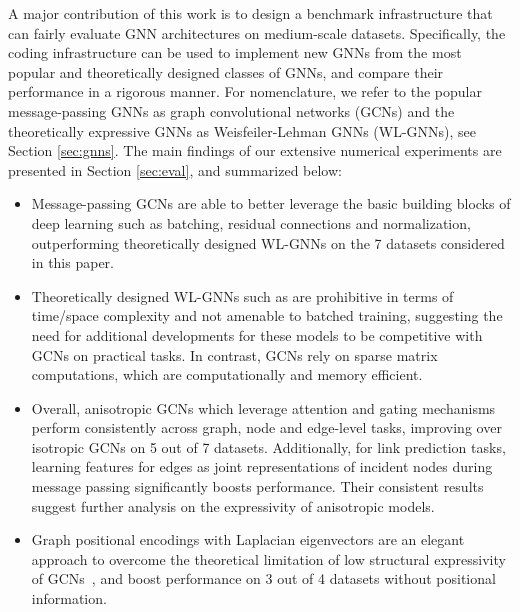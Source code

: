 \documentclass{article}
\begin{document}
A major contribution of this work is to design a benchmark infrastructure that can fairly evaluate GNN architectures on medium-scale datasets. Specifically, the coding infrastructure can be used to implement new GNNs from the most popular and theoretically designed classes of GNNs, and compare their performance in a rigorous manner. 
For nomenclature, we refer to the popular message-passing GNNs as graph convolutional networks (GCNs) and the theoretically expressive GNNs as Weisfeiler-Lehman GNNs (WL-GNNs), see Section \ref{sec:gnns}.
The main findings of our extensive numerical experiments are presented in Section \ref{sec:eval}, and summarized below:\vspace{-0.2cm}
\begin{itemize}[leftmargin=*]
    \item Message-passing GCNs \cite{kipf2017semi,hamilton2017inductive,Monti_2017,velickovic2018graph,bresson2017residual} are able to better leverage the basic building blocks of deep learning such as batching, residual connections and normalization, outperforming theoretically designed WL-GNNs \cite{xu2018how,maron2019provably,chen2019equivalence} on the 7 datasets considered in this paper.\vspace{-0.0cm}
\item Theoretically designed WL-GNNs such as \cite{maron2019provably,chen2019equivalence} are prohibitive in terms of time/space complexity and not amenable to batched training, suggesting 
    the need for additional developments for these models to be competitive with GCNs on practical tasks.\vspace{-0.0cm}
    In contrast, GCNs rely on sparse matrix computations, which are computationally and memory efficient.
    \item Overall, anisotropic GCNs which leverage attention \cite{velickovic2018graph} and gating \cite{bresson2017residual} mechanisms perform consistently across graph, node and edge-level tasks, improving over isotropic GCNs on 5
out of 7 datasets.
Additionally, for link prediction tasks, learning features for edges as joint representations of incident nodes during message passing significantly boosts performance. Their consistent results suggest further analysis on the expressivity of anisotropic models.\vspace{-0.0cm}
    \item Graph positional encodings with Laplacian eigenvectors \cite{belkin2003laplacian} are an elegant approach to overcome the theoretical limitation of low structural
expressivity of GCNs~\cite{murphy2019relational,srinivasan2019equivalence}, and boost performance on 3 out of 4 datasets without positional information.\vspace{-0.2cm}
\end{itemize} 
\end{document}
